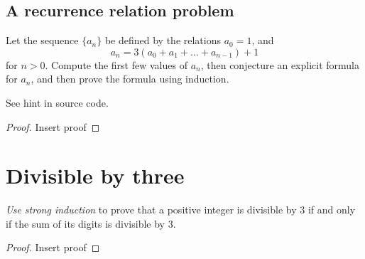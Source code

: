 \documentclass[10pt]{amsart}
\begin{document}
\subsection{A recurrence relation problem}
Let the sequence $\{ a_n\}$ be defined by the relations $a_0=1$, and 
\[
a_n = 3(a_0 + a_1 + \dots + a_{n-1}) + 1
\]
for $n>0$. 
Compute the first few values of $a_n$, then conjecture an explicit formula for $a_n$, and then prove the formula using induction.

See hint in source code.

\begin{proof}
	Insert proof
\end{proof}


\section{Divisible by three}
\emph{Use strong induction} to prove that a positive integer is divisible by $3$ if and only if the sum of its digits is divisible by $3$.

\begin{proof}
	Insert proof
\end{proof}
\end{document}
